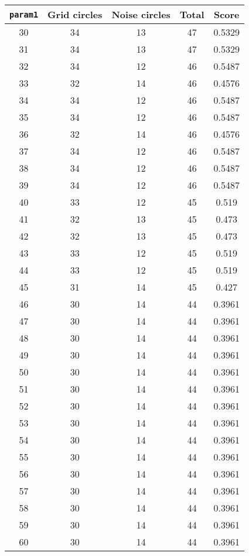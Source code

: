 \documentclass[letterpaper, 12pt]{article}
\begin{document}
\begin{longtable}{|c|c|c|c|c|}
\hline
\textbf{\texttt{param1}} & \textbf{Grid circles} & \textbf{Noise circles} & \textbf{Total} & \textbf{Score} \\
\hline
30 & 34 & 13 & 47 & 0.5329 \\
\hline
31 & 34 & 13 & 47 & 0.5329 \\
\hline
32 & 34 & 12 & 46 & 0.5487 \\
\hline
33 & 32 & 14 & 46 & 0.4576 \\
\hline
34 & 34 & 12 & 46 & 0.5487 \\
\hline
35 & 34 & 12 & 46 & 0.5487 \\
\hline
36 & 32 & 14 & 46 & 0.4576 \\
\hline
37 & 34 & 12 & 46 & 0.5487 \\
\hline
38 & 34 & 12 & 46 & 0.5487 \\
\hline
39 & 34 & 12 & 46 & 0.5487 \\
\hline
40 & 33 & 12 & 45 & 0.519 \\
\hline
41 & 32 & 13 & 45 & 0.473 \\
\hline
42 & 32 & 13 & 45 & 0.473 \\
\hline
43 & 33 & 12 & 45 & 0.519 \\
\hline
44 & 33 & 12 & 45 & 0.519 \\
\hline
45 & 31 & 14 & 45 & 0.427 \\
\hline
46 & 30 & 14 & 44 & 0.3961 \\
\hline
47 & 30 & 14 & 44 & 0.3961 \\
\hline
48 & 30 & 14 & 44 & 0.3961 \\
\hline
49 & 30 & 14 & 44 & 0.3961 \\
\hline
50 & 30 & 14 & 44 & 0.3961 \\
\hline
51 & 30 & 14 & 44 & 0.3961 \\
\hline
52 & 30 & 14 & 44 & 0.3961 \\
\hline
53 & 30 & 14 & 44 & 0.3961 \\
\hline
54 & 30 & 14 & 44 & 0.3961 \\
\hline
55 & 30 & 14 & 44 & 0.3961 \\
\hline
56 & 30 & 14 & 44 & 0.3961 \\
\hline
57 & 30 & 14 & 44 & 0.3961 \\
\hline
58 & 30 & 14 & 44 & 0.3961 \\
\hline
59 & 30 & 14 & 44 & 0.3961 \\
\hline
60 & 30 & 14 & 44 & 0.3961 \\

\end{longtable}
\end{document}
